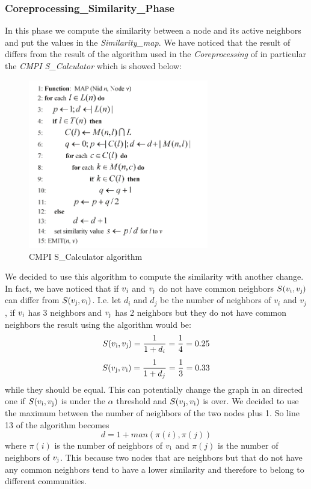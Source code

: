 \documentclass[12pt]{article}
\begin{document}
\subsubsection{Coreprocessing\_Similarity\_Phase}
In this phase we compute the similarity between a node and its active neighbors and put the values in the \emph{Similarity\_map}. We have noticed that the result of  differs from the result of the algorithm used in the \emph{Coreprocessing} of \cite{6517336} in particular the \emph{CMPI S\_Calculator} which is showed below:
     \begin{figure}[H]
       \centering
         \includegraphics[width=0.7\textwidth]{similarity-code.png}
       \caption{CMPI S\_Calculator algorithm}
       \label{fig:depold}
     \end{figure}
We decided to use this algorithm to compute the similarity with another change. In fact, we have noticed that
if $v\textsubscript{i}$ and $v\textsubscript{j}$ do not have common neighbors $S(v\textsubscript{i},v\textsubscript{j})$ can differ from  $S(v\textsubscript{j},v\textsubscript{i})$. I.e. let $d_i$ and $d_j$ be the number of neighbors of $v_i$ and $v_j$, if $v\textsubscript{i}$ has 3 neighbors and $v\textsubscript{j}$ has 2 neighbors but they do not have common neighbors the result using the algorithm would be:
\begin{equation}
  S(v\textsubscript{i},v\textsubscript{j}) = \frac{1}{1 + d_i} = \frac{1}{4} = 0.25
\end{equation}
\begin{equation}
  S(v\textsubscript{j},v\textsubscript{i}) = \frac{1}{1 + d_j} = \frac{1}{3} = 0.33
\end{equation}
while they should be equal. This can potentially change the graph in an directed one if   $S(v\textsubscript{i},v\textsubscript{j})$ is under the $\alpha$ threshold and $S(v\textsubscript{j},v\textsubscript{i})$ is over.
We decided to use the maximum between the number of neighbors of the two nodes plus 1. So line 13 of the algorithm becomes
\begin{equation}
    d = 1 + man(\pi(i), \pi(j))
\end{equation}
where $\pi(i)$ is the number of neighbors of $v\textsubscript{i}$ and $\pi(j)$ is the number of neighbors of $v\textsubscript{j}$. This because two nodes that are neighbors but that do not have any common neighbors tend to have a lower similarity and therefore to belong to different communities.
\end{document}
